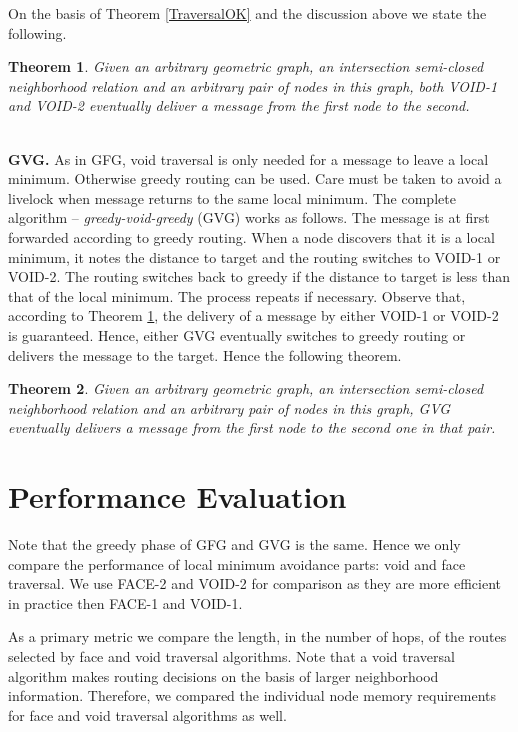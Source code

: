 \documentclass[conference]{IEEEtran}
\newtheorem{theorem}{Theorem}
\begin{document}
On the basis of Theorem \ref{TraversalOK} and the discussion above
we state the following.

\begin{theorem}\label{VoidsOK}
Given an arbitrary geometric graph, an intersection semi-closed
neighborhood relation and an arbitrary pair of nodes in this graph,
both VOID-1 and VOID-2 eventually deliver a message from the first
node to the second.
\end{theorem}


\ \\ \textbf{GVG.} As in GFG, void traversal is only needed for a
message to leave a local minimum. Otherwise greedy routing can be
used. Care must be taken to avoid a livelock when message returns to
the same local minimum.  The complete algorithm --
\emph{greedy-void-greedy} (GVG) works as follows. The message is at
first forwarded according to greedy routing. When a node discovers
that it is a local minimum, it notes the distance to target and the
routing switches to VOID-1 or VOID-2.  The routing switches back to
greedy if the distance to target is less than that of the local
minimum.  The process repeats if necessary.  Observe that, according
to Theorem \ref{VoidsOK}, the delivery of a message by either VOID-1
or VOID-2 is guaranteed. Hence, either GVG eventually switches to
greedy routing or delivers the message to the target. Hence the
following theorem.

\begin{theorem}
Given an arbitrary geometric graph, an intersection semi-closed
neighborhood relation and an arbitrary pair of nodes in this graph,
GVG eventually delivers a message from the first node to the second
one in that pair.
\end{theorem}










\section{Performance Evaluation}
\label{SecEval}

Note that the greedy phase of GFG and GVG is the same. Hence we only
compare the performance of local minimum avoidance parts: void and
face traversal. We use FACE-2 and VOID-2 for comparison as they are
more efficient in practice then FACE-1 and VOID-1.

As a primary metric we compare the length, in the number of hops, of
the routes selected by face and void traversal algorithms. Note that a
void traversal algorithm makes routing decisions on the basis of
larger neighborhood information. Therefore, we compared the individual
node memory requirements for face and void traversal algorithms as
well.
\end{document}
